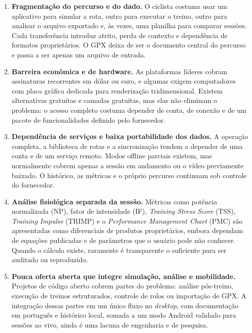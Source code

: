 \begin{enumerate}
    \item \textbf{Fragmentação do percurso e do dado.} O ciclista costuma
        usar um aplicativo para simular a rota, outro para executar o treino,
        outro para analisar o arquivo exportado e, às vezes, uma planilha para
        comparar sessões. Cada transferência introduz atrito, perda de contexto
        e dependência de formatos proprietários. O GPX deixa de ser o documento
        central do percurso e passa a ser apenas um arquivo de entrada.

    \item \textbf{Barreira econômica e de hardware.} As plataformas líderes
        cobram assinaturas recorrentes em dólar ou euro, e algumas exigem
        computadores com placa gráfica dedicada para renderização
        tridimensional. Existem alternativas gratuitas e camadas gratuitas, mas
        elas não eliminam o problema: o acesso completo costuma depender de
        conta, de conexão e de um pacote de funcionalidades definido pelo
        fornecedor.

    \item \textbf{Dependência de serviços e baixa portabilidade dos dados.}
        A operação completa, a biblioteca de rotas e a sincronização tendem a
        depender de uma conta e de um serviço remoto. Modos offline parciais
        existem, mas normalmente cobrem apenas a sessão em andamento ou o vídeo
        previamente baixado. O histórico, as métricas e o próprio percurso
        continuam sob controle do fornecedor.

    \item \textbf{Análise fisiológica separada da sessão.} Métricas como
        potência normalizada (NP), fator de intensidade (IF), \textit{Training
        Stress Score} (TSS), \textit{Training Impulse} (TRIMP) e o
        \textit{Performance Management Chart} (PMC) são apresentadas como
        diferenciais de produtos proprietários, embora dependam de equações
        publicadas e de parâmetros que o usuário pode não conhecer. Quando o
        cálculo existe, raramente é transparente o suficiente para ser
        auditado ou reproduzido.

    \item \textbf{Pouca oferta aberta que integre simulação, análise e
        mobilidade.} Projetos de código aberto cobrem partes do problema:
        análise pós-treino, execução de treinos estruturados, controle de
        rolos ou importação de GPX. A integração dessas partes em um único
        fluxo no \textit{desktop}, com documentação em português e histórico
        local, somada a um modo Android validado para sessões ao vivo, ainda é
        uma lacuna de engenharia e de pesquisa.
\end{enumerate}

